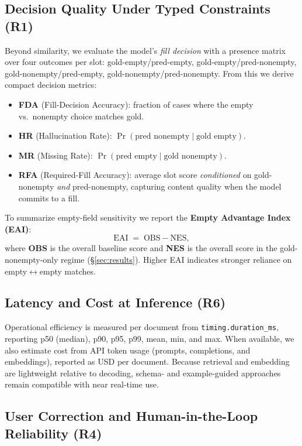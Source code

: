 \subsection{Decision Quality Under Typed Constraints (R1)}
\label{subsec:consistency}

Beyond similarity, we evaluate the model's \emph{fill decision} with a presence matrix over four outcomes per slot: 
gold-empty/pred-empty, gold-empty/pred-nonempty, gold-nonempty/pred-empty, gold-nonempty/pred-nonempty. 
From this we derive compact decision metrics:
\begin{itemize}
  \item \textbf{FDA} (Fill-Decision Accuracy): fraction of cases where the empty vs.\ nonempty choice matches gold.
  \item \textbf{HR} (Hallucination Rate): $\Pr(\text{pred nonempty} \mid \text{gold empty})$.
  \item \textbf{MR} (Missing Rate): $\Pr(\text{pred empty} \mid \text{gold nonempty})$.
  \item \textbf{RFA} (Required-Fill Accuracy): average slot score \emph{conditioned} on gold-nonempty \emph{and} pred-nonempty, capturing content quality when the model commits to a fill.
\end{itemize}
To summarize empty-field sensitivity we report the \textbf{Empty Advantage Index (EAI)}:
\[
\text{EAI} \;=\; \text{OBS} - \text{NES},
\]
where \textbf{OBS} is the overall baseline score and \textbf{NES} is the overall score in the gold-nonempty-only regime (\S\ref{sec:results}). 
Higher EAI indicates stronger reliance on empty$\leftrightarrow$empty matches.



\subsection{Latency and Cost at Inference (R6)}
\label{subsec:latency-cost}

Operational efficiency is measured per document from \texttt{timing.duration\_ms}, reporting p50 (median), p90, p95, p99, mean, min, and max. 
When available, we also estimate cost from API token usage (prompts, completions, and embeddings), reported as USD per document. 
Because retrieval and embedding are lightweight relative to decoding, schema- and example-guided approaches remain compatible with near real-time use.

\subsection{User Correction and Human-in-the-Loop Reliability (R4)}
\label{subsec:correction}

